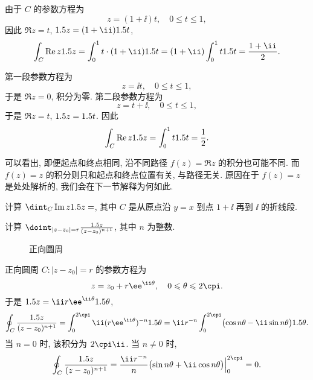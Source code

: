 \begin{solutionenum}
  \item 由于 $C$ 的参数方程为
  \[
    z=(1+\ii)t,\quad 0\le t\le 1,
  \]
  因此 $\Re z=t$, $\d z=(1+\ii)\d t$,
  \[
      \int_C \Re z\d z=\int_0^1t\cdot(1+\ii)\d t
    =(1+\ii)\int_0^1t\d t
    =\frac{1+\ii}2.
  \]
  \item 第一段参数方程为
  \[
    z=\ii t,\quad 0\le t\le 1,
  \]
  于是 $\Re z=0$, 积分为零. 第二段参数方程为
  \[
    z=t+\ii,\quad 0\le t\le 1,
  \]
  于是 $\Re z=t$, $1.5 z=1.5 t$. 因此
  \[
    \int_C \operatorname{Re} z1.5 z=\int_0^1 t1.5 t=\frac12.
  \]
\end{solutionenum}

可以看出, 即便起点和终点相同, 沿不同路径 $f(z)=\Re z$ 的积分也可能不同.
而 $f(z)=z$ 的积分则只和起点和终点位置有关, 与路径无关.
原因在于 $f(z)=z$ 是处处解析的, 我们会在下一节解释为何如此.

\begin{exercise}
  计算 $\dint_C\Im z\d z=$\fillblank[2cm]{}, 其中 $C$ 是从原点沿 $y=x$ 到点 $1+\ii$ 再到 $\ii$ 的折线段.
\end{exercise}

\begin{example}
  计算 $\doint_{|z-z_0|=r}\frac{\d z}{(z-z_0)^{n+1}}$, 其中 $n$ 为整数.
\end{example}

\begin{figure}[!htb]
  \centering
  \caption{正向圆周}
\end{figure}

\begin{solution}
  正向圆周 $C: |z-z_0|=r$ 的参数方程为
  \[
    z=z_0+r\ee^{\ii \theta},\quad 0\le \theta\le 2\cpi.
  \]
  于是 $\d z=\ii r\ee^{\ii \theta}\d \theta$,
  \[
     \oint_C\frac{\d z}{(z-z_0)^{n+1}}
    =\int_0^{2\cpi} \ii(r\ee^{\ii \theta})^{-n}\d\theta
    =\ii r^{-n}\int_0^{2\cpi}\bigl(\cos n\theta-\ii\sin n\theta\bigr)\d\theta.
  \]
  当 $n=0$ 时, 该积分为 $2\cpi\ii$.
  当 $n\neq 0$ 时, 
  \[
      \oint_C\frac{\d z}{(z-z_0)^{n+1}}
    =\dfrac{\ii r^{-n}}{n}\bigl(\sin n\theta+\ii\cos n\theta\bigr)\Big|_0^{2\cpi}=0.
  \]
\end{solution}

